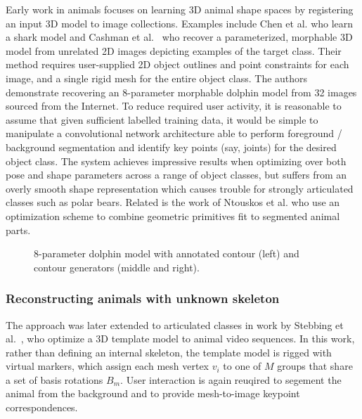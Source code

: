     Early work in animals focuses on learning 3D animal shape spaces by registering an input 3D model to image collections. Examples include Chen et al. who learn a shark model and Cashman et al.~\cite{cashman2013shape} who recover a parameterized, morphable 3D model from unrelated 2D images depicting examples of the target class. Their method requires user-supplied 2D object outlines and point constraints for each image, and a single rigid mesh for the entire object class. The authors demonstrate recovering an 8-parameter morphable dolphin model from 32 images sourced from the Internet. To reduce required user activity, it is reasonable to assume that given sufficient labelled training data, it would be simple to manipulate a convolutional network architecture able to perform foreground / background segmentation and identify key points (say, joints) for the desired object class. The system achieves impressive results when optimizing over both pose and shape parameters across a range of object classes, but suffers from an overly smooth shape representation which causes trouble for strongly articulated classes such as polar bears. Related is the work of Ntouskos et al. who use an optimization scheme to combine geometric primitives fit to segmented animal parts.

    \begin{figure}[t] %
        \caption{8-parameter dolphin model with annotated contour (left) and contour generators (middle and right).}
        \label{fig:cashman_fitzgibbon}
    \end{figure}

    
    \subsubsection{Reconstructing animals with unknown skeleton}

    The approach was later extended to articulated classes in work by Stebbing et al.~\cite{arap_stebbing}, who optimize a 3D template model to animal video sequences. In this work, rather than defining an internal skeleton, the template model is rigged with virtual markers, which assign each mesh vertex $v_i$ to one of $M$ groups that share a set of basis rotations $B_{m}$. User interaction is again reuqired to segement the animal from the background and to provide mesh-to-image keypoint correspondences.

